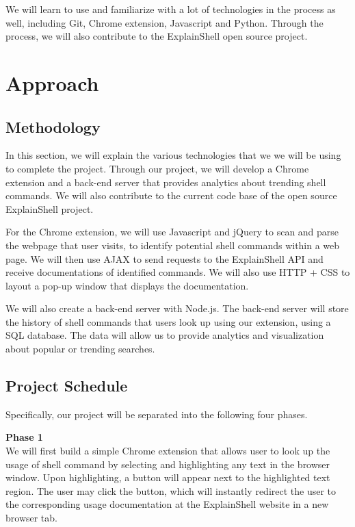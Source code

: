 \documentclass[11pt]{article}
\begin{document}
We will learn to use and familiarize with a lot of technologies in the process as well, including Git, Chrome extension, Javascript and Python. Through the process, we will also contribute to the ExplainShell open source project.

\section{Approach}
\subsection{Methodology}

In this section, we will explain the various technologies that we we will be using to complete the project. Through our project, we will develop a Chrome extension and a back-end server that provides analytics about trending shell commands. We will also contribute to the current code base of the open source ExplainShell project. 

For the Chrome extension, we will use Javascript and jQuery to scan and parse the webpage that user visits, to identify potential shell commands within a web page. We will then use AJAX to send requests to the ExplainShell API and receive documentations of identified commands. We will also use HTTP + CSS to layout a pop-up window that displays the documentation. 

We will also create a back-end server with Node.js. The back-end server will store the history of shell commands that users look up using our extension, using a SQL database. The data will allow us to provide analytics and visualization about popular or trending searches.

\subsection{Project Schedule}
Specifically, our project will be separated into the following four phases. 

\par{\bf Phase 1}\\ 
We will first build a simple Chrome extension that allows user to look up the usage of shell command by selecting and highlighting any text in the browser window. Upon highlighting, a button will appear next to the highlighted text region. The user may click the button, which will instantly redirect the user to the corresponding usage documentation at the ExplainShell website in a new browser tab.
\end{document}
